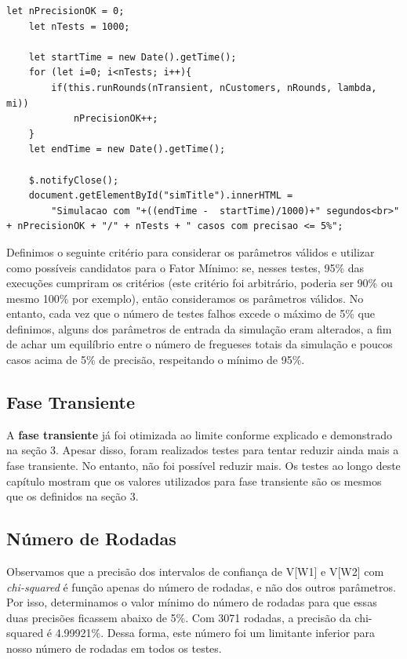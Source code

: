 \documentclass[a4paper,12pt]{report}
\begin{document}
\begin{lstlisting}[caption={Rotina automatizada de teste.},captionpos=b]
    let nPrecisionOK = 0;
    let nTests = 1000;
    
    let startTime = new Date().getTime();
    for (let i=0; i<nTests; i++){
    	if(this.runRounds(nTransient, nCustomers, nRounds, lambda, mi))
    		nPrecisionOK++;
    }
    let endTime = new Date().getTime();
    
    $.notifyClose();
    document.getElementById("simTitle").innerHTML = 
        "Simulacao com "+((endTime -  startTime)/1000)+" segundos<br>" + nPrecisionOK + "/" + nTests + " casos com precisao <= 5%";
\end{lstlisting}

Definimos o seguinte critério para considerar os parâmetros válidos e utilizar como possíveis candidatos para o Fator Mínimo: se, nesses testes, 95\% das execuções cumpriram os critérios (este critério foi arbitrário, poderia ser 90\% ou mesmo 100\% por exemplo), então consideramos os parâmetros válidos. No entanto, cada vez que o número de testes falhos excede o máximo de 5\% que definimos, alguns dos parâmetros de entrada da simulação eram alterados, a fim de achar um equilíbrio entre o número de fregueses totais da simulação e poucos casos acima de 5\% de precisão, respeitando o mínimo de 95\%.

\subsection{Fase Transiente}

A \textbf{fase transiente} já foi otimizada ao limite conforme explicado e demonstrado na seção 3. Apesar disso, foram realizados testes para tentar reduzir ainda mais a fase transiente. No entanto, não foi possível reduzir mais. Os testes ao longo deste capítulo mostram que os valores utilizados para fase transiente são os mesmos que os definidos na seção 3.

\subsection{Número de Rodadas}

Observamos que a precisão dos intervalos de confiança de V[W1] e V[W2] com \emph{chi-squared} é função apenas do número de rodadas, e não dos outros parâmetros. Por isso, determinamos o valor mínimo do número de rodadas para que essas duas precisões ficassem abaixo de 5\%.
Com 3071 rodadas, a precisão da chi-squared é 4.99921\%. Dessa forma, este número foi um limitante inferior para nosso número de rodadas em todos os testes.
\end{document}
